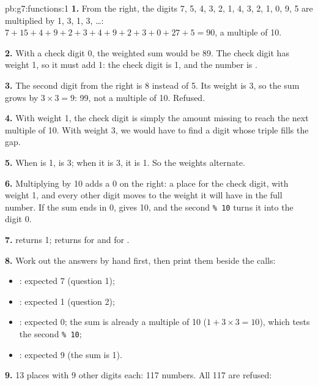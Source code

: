 \begin{solution}{pb:g7:functions:1}
\textbf{1.} From the right, the digits 7, 5, 4, 3, 2, 1, 4, 3, 2, 1, 0, 9, 5
are multiplied by 1, 3, 1, 3, \dots: $7 + 15 + 4 + 9 + 2 + 3 + 4 + 9 + 2 + 3 + 0
+ 27 + 5 = 90$, a multiple of 10.

\textbf{2.} With a check digit 0, the weighted sum would be 89. The check digit
has weight 1, so it must add 1: the check digit is 1, and the number is
.

\textbf{3.} The second digit from the right is 8 instead of 5. Its weight is 3,
so the sum grows by $3 \times 3 = 9$: 99, not a multiple of 10. Refused.

\textbf{4.} With weight 1, the check digit is simply the amount missing to
reach the next multiple of 10. With weight 3, we would have to find a digit
whose triple fills the gap.

\textbf{5.} When  is 1,  is 3; when it is 3, it
is 1. So the weights alternate.

\textbf{6.} Multiplying by 10 adds a 0 on the right: a place for the check
digit, with weight 1, and every other digit moves to the weight it will have in
the full number. If the sum ends in 0,  gives 10, and the second
\texttt{\% 10} turns it into the digit 0.

\textbf{7.}  returns 1;  returns
 for  and  for .

\textbf{8.} Work out the answers by hand first, then print them beside the
calls:
\begin{itemize}
  \item {}: expected 7 (question 1);
  \item {}: expected 1 (question 2);
  \item {}: expected 0; the sum is already a
    multiple of 10 ($1 + 3 \times 3 = 10$), which tests the second \texttt{\% 10};
  \item {}: expected 9 (the sum is 1).
\end{itemize}

\textbf{9.} 13 places with 9 other digits each: 117 numbers. All 117 are
refused:

\label{out:g7:functions:one-digit}


\end{solution}
